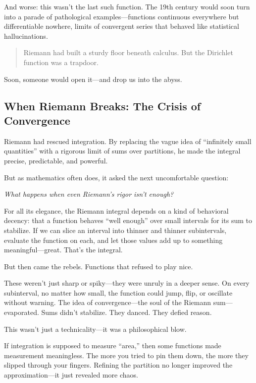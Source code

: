 \medskip

And worse: this wasn't the last such function. The 19th century would soon turn into a parade of pathological examples—functions continuous everywhere but differentiable nowhere, limits of convergent series that behaved like statistical hallucinations.

\begin{quote}
Riemann had built a sturdy floor beneath calculus.  
But the Dirichlet function was a trapdoor.
\end{quote}

Soon, someone would open it—and drop us into the abyss.



\subsection{When Riemann Breaks: The Crisis of Convergence}

Riemann had rescued integration. By replacing the vague idea of “infinitely small quantities” with a rigorous limit of sums over partitions, he made the integral precise, predictable, and powerful.

But as mathematics often does, it asked the next uncomfortable question:

\begin{center}
\emph{What happens when even Riemann's rigor isn't enough?}
\end{center}

For all its elegance, the Riemann integral depends on a kind of behavioral decency: that a function behaves “well enough” over small intervals for its sum to stabilize. If we can slice an interval into thinner and thinner subintervals, evaluate the function on each, and let those values add up to something meaningful—great. That’s the integral.

But then came the rebels. Functions that refused to play nice.

These weren’t just sharp or spiky—they were unruly in a deeper sense. On every subinterval, no matter how small, the function could jump, flip, or oscillate without warning. The idea of convergence—the soul of the Riemann sum—evaporated. Sums didn’t stabilize. They danced. They defied reason.

\medskip

This wasn’t just a technicality—it was a philosophical blow.

If integration is supposed to measure “area,” then some functions made measurement meaningless. The more you tried to pin them down, the more they slipped through your fingers. Refining the partition no longer improved the approximation—it just revealed more chaos.

